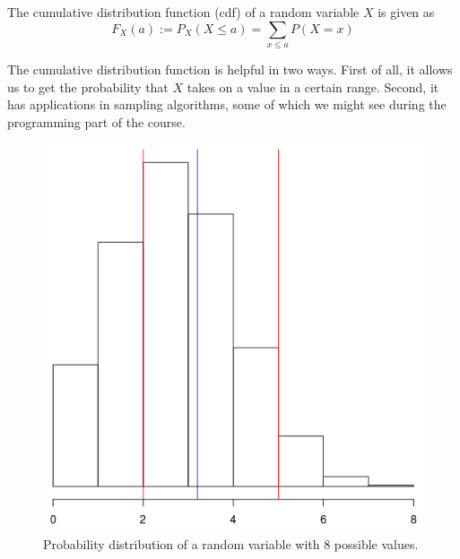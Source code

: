 \documentclass[a4paper,11pt,leqno]{report}
\begin{document}
\begin{Definition}
The cumulative distribution function (cdf) of a random variable $ X $ is given as
$$ F_{X}(a) := P_{X}(X \leq a) = {\underset{x \leq a}{\sum}}P(X=x) $$
\end{Definition}

The cumulative distribution function is helpful in two ways. First of all, it allows us to get the probability that
$ X $ takes on a value in a certain range. Second, it has applications in sampling algorithms, some of which we might
see during the programming part of the course.

\begin{figure}
\center
\includegraphics[scale=.3]{histogram.png}
\caption{Probability distribution of a random variable with $ 8 $ possible values.}
\label{binomplot}
\end{figure}
\end{document}
